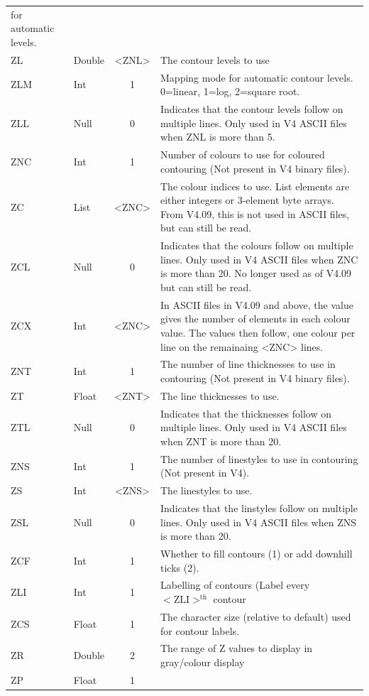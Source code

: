 \documentclass[english]{article}
\begin{document}
\begin{longtable}{|llcp{8cm}|}
  for automatic levels.\\
  ZL& Double& <ZNL>&
  The contour levels to use\\
  ZLM & Int & 1 & Mapping mode for automatic contour levels. 0=linear,
  1=log, 2=square root. \\
  ZLL & Null & 0 & Indicates that the contour levels follow on multiple
  lines. Only used in V4 ASCII files when ZNL is more than 5.\\
  ZNC& Int& 1&
  Number of colours to use for coloured contouring (Not present in V4
  binary files).\\
  ZC& List & <ZNC>&
  The colour indices to use. List elements are either integers or
  3-element byte arrays. From V4.09, this is not used in ASCII files,
  but can still be read.\\
  ZCL & Null & 0 & Indicates that the colours follow on multiple
  lines. Only used in V4 ASCII files when ZNC is more than 20. No
  longer used as of V4.09 but can still be read.\\
  ZCX & Int & <ZNC> & In ASCII files in V4.09 and above, the value
  gives the number of elements in each colour value. The values then
  follow, one colour per line on the remainaing <ZNC> lines. \\
  ZNT& Int & 1&
  The number of line thicknesses to use in contouring (Not present in
  V4 binary files).\\
  ZT& Float& <ZNT>&
  The line thicknesses to use.\\
  ZTL & Null & 0 & Indicates that the thicknesses follow on multiple
  lines. Only used in V4 ASCII files when ZNT is more than 20.\\
  ZNS& Int& 1&
  The number of linestyles to use in contouring (Not present in V4).\\
  ZS& Int& <ZNS>&
  The linestyles to use.\\
  ZSL & Null & 0 & Indicates that the linstyles follow on multiple
  lines. Only used in V4 ASCII files when ZNS is more than 20.\\
  ZCF& Int& 1&
  Whether to fill contours (1) or add downhill ticks (2).\\
  ZLI& Int& 1&
  Labelling of contours (Label every $\mathrm{<ZLI>^{th}}$ contour\\
  ZCS & Float & 1 & The character size (relative to default) used for
  contour labels.\\
  ZR& Double& 2&
  The range of Z values to display in gray/colour display\\
  ZP& Float& 1&

\end{longtable}
\end{document}

